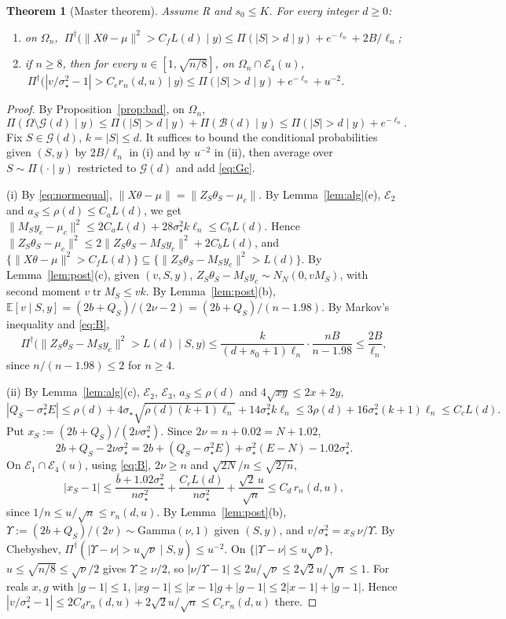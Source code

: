 \documentclass[11pt]{article}
\newtheorem{theorem}{Theorem}[section]
\theoremstyle{remark}
\newcommand{\E}{\mathbb E}
\newcommand{\Pd}{\Pi^\dagger}
\newcommand{\tr}{\operatorname{tr}}
\newcommand{\sst}{\sigma_\star}
\begin{document}
\begin{theorem}[Master theorem]\label{thm:master}
Assume R and $s_0\le K$. For every integer $d\ge0$:
\begin{enumerate}[label=(\roman*)]
\item on $\Omega_n$, $\ \Pd\big(\|X\theta-\mu\|^2>C_fL(d)\mid y\big)\le\Pi(|S|>d\mid y)+e^{-\ell_n}+2B/\ell_n$;
\item if $n\ge8$, then for every $u\in[1,\sqrt{n/8}]$, on $\Omega_n\cap\mathcal E_4(u)$, $\ \Pd\big(|v/\sst^2-1|>C_er_n(d,u)\mid y\big)\le\Pi(|S|>d\mid y)+e^{-\ell_n}+u^{-2}$.
\end{enumerate}
\end{theorem}

\begin{proof}
By Proposition~\ref{prop:bad}, on $\Omega_n$,
\begin{equation}\label{eq:Gc}
\Pi(\Omega\setminus\mathcal G(d)\mid y)\le\Pi(|S|>d\mid y)+\Pi(\mathcal B(d)\mid y)\le\Pi(|S|>d\mid y)+e^{-\ell_n}.
\end{equation}
Fix $S\in\mathcal G(d)$, $k=|S|\le d$. It suffices to bound the conditional probabilities given $(S,y)$ by $2B/\ell_n$ in (i) and by $u^{-2}$ in (ii), then average over $S\sim\Pi(\cdot\mid y)$ restricted to $\mathcal G(d)$ and add \eqref{eq:Gc}.

(i) By \eqref{eq:normequal}, $\|X\theta-\mu\|=\|Z_S\theta_S-\mu_c\|$. By Lemma~\ref{lem:alg}(e), $\mathcal E_2$ and $a_S\le\rho(d)\le C_aL(d)$, we get $\|M_Sy_c-\mu_c\|^2\le2C_aL(d)+28\sst^2k\ell_n\le C_bL(d)$. Hence $\|Z_S\theta_S-\mu_c\|^2\le2\|Z_S\theta_S-M_Sy_c\|^2+2C_bL(d)$, and $\{\|X\theta-\mu\|^2>C_fL(d)\}\subseteq\{\|Z_S\theta_S-M_Sy_c\|^2>L(d)\}$. By Lemma~\ref{lem:post}(c), given $(v,S,y)$, $Z_S\theta_S-M_Sy_c\sim N_N(0,vM_S)$, with second moment $v\tr M_S\le vk$. By Lemma~\ref{lem:post}(b), $\E[v\mid S,y]=(2b+Q_S)/(2\nu-2)=(2b+Q_S)/(n-1.98)$. By Markov's inequality and \eqref{eq:B},
\[
\Pd\big(\|Z_S\theta_S-M_Sy_c\|^2>L(d)\mid S,y\big)\le\frac{k}{(d+s_0+1)\ell_n}\cdot\frac{nB}{n-1.98}\le\frac{2B}{\ell_n},
\]
since $n/(n-1.98)\le2$ for $n\ge4$.

(ii) By Lemma~\ref{lem:alg}(c), $\mathcal E_2$, $\mathcal E_3$, $a_S\le\rho(d)$ and $4\sqrt{xy}\le2x+2y$,
\[
|Q_S-\sst^2E|\le\rho(d)+4\sst\sqrt{\rho(d)(k+1)\ell_n}+14\sst^2k\ell_n\le3\rho(d)+16\sst^2(k+1)\ell_n\le C_cL(d).
\]
Put $x_S:=(2b+Q_S)/(2\nu\sst^2)$. Since $2\nu=n+0.02=N+1.02$,
\[
2b+Q_S-2\nu\sst^2=2b+(Q_S-\sst^2E)+\sst^2(E-N)-1.02\sst^2 .
\]
On $\mathcal E_1\cap\mathcal E_4(u)$, using \eqref{eq:B}, $2\nu\ge n$ and $\sqrt{2N}/n\le\sqrt{2/n}$,
\[
|x_S-1|\le\frac{\bar b+1.02\sst^2}{n\sst^2}+\frac{C_cL(d)}{n\sst^2}+\frac{\sqrt2\,u}{\sqrt n}\le C_d\,r_n(d,u),
\]
since $1/n\le u/\sqrt n\le r_n(d,u)$. By Lemma~\ref{lem:post}(b), $\Upsilon:=(2b+Q_S)/(2v)\sim\mathrm{Gamma}(\nu,1)$ given $(S,y)$, and $v/\sst^2=x_S\,\nu/\Upsilon$. By Chebyshev, $\Pd(|\Upsilon-\nu|>u\sqrt\nu\mid S,y)\le u^{-2}$. On $\{|\Upsilon-\nu|\le u\sqrt\nu\}$, $u\le\sqrt{n/8}\le\sqrt\nu/2$ gives $\Upsilon\ge\nu/2$, so $|\nu/\Upsilon-1|\le2u/\sqrt\nu\le2\sqrt2u/\sqrt n\le1$. For reals $x,g$ with $|g-1|\le1$, $|xg-1|\le|x-1|g+|g-1|\le2|x-1|+|g-1|$. Hence $|v/\sst^2-1|\le2C_dr_n(d,u)+2\sqrt2u/\sqrt n\le C_er_n(d,u)$ there.
\end{proof}
\end{document}
